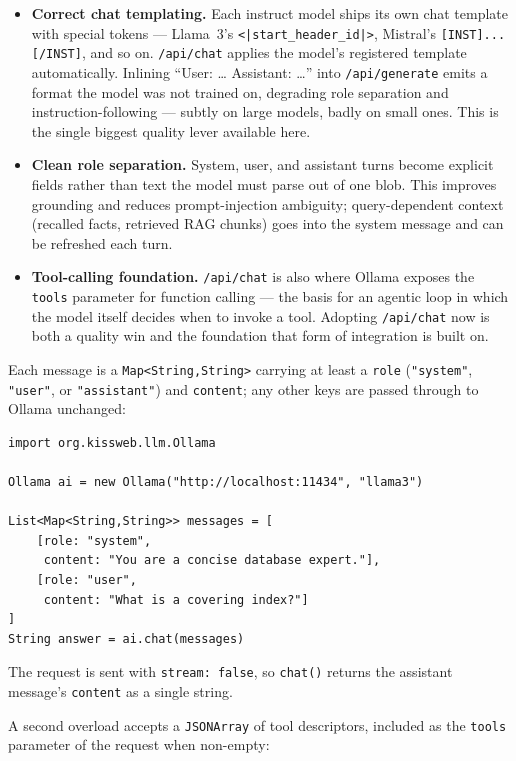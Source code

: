 \begin{itemize}
  \item \textbf{Correct chat templating.} Each instruct model ships its own chat template with special tokens --- Llama~3's \texttt{<|start\_header\_id|>}, Mistral's \texttt{[INST]...[/INST]}, and so on.  \texttt{/api/chat} applies the model's registered template automatically.  Inlining ``User: \dots{} Assistant: \dots'' into \texttt{/api/generate} emits a format the model was not trained on, degrading role separation and instruction-following --- subtly on large models, badly on small ones.  This is the single biggest quality lever available here.
  \item \textbf{Clean role separation.} System, user, and assistant turns become explicit fields rather than text the model must parse out of one blob.  This improves grounding and reduces prompt-injection ambiguity; query-dependent context (recalled facts, retrieved RAG chunks) goes into the system message and can be refreshed each turn.
  \item \textbf{Tool-calling foundation.} \texttt{/api/chat} is also where Ollama exposes the \texttt{tools} parameter for function calling --- the basis for an agentic loop in which the model itself decides when to invoke a tool.  Adopting \texttt{/api/chat} now is both a quality win and the foundation that form of integration is built on.
\end{itemize}

\noindent
Each message is a \texttt{Map<String,String>} carrying at least a \texttt{role} (\texttt{"system"}, \texttt{"user"}, or \texttt{"assistant"}) and \texttt{content}; any other keys are passed through to Ollama unchanged:

\begin{lstlisting}[style=groovy]
import org.kissweb.llm.Ollama

Ollama ai = new Ollama("http://localhost:11434", "llama3")

List<Map<String,String>> messages = [
    [role: "system",
     content: "You are a concise database expert."],
    [role: "user",
     content: "What is a covering index?"]
]
String answer = ai.chat(messages)
\end{lstlisting}

\noindent
The request is sent with \texttt{stream:\ false}, so \texttt{chat()} returns the assistant message's \texttt{content} as a single string.

A second overload accepts a \texttt{JSONArray} of tool descriptors, included as the \texttt{tools} parameter of the request when non-empty:

